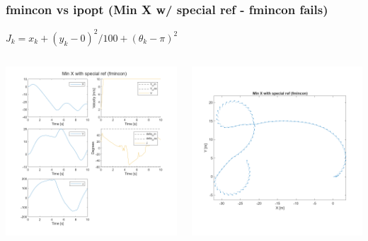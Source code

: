 \documentclass[aspectratio=169]{beamer}
\begin{document}
\begin{frame}
	\frametitle{fmincon vs ipopt (Min X w/ special ref - fmincon fails)}
	$J_k = x_k + (y_k - 0)^2/100 + (\theta_k - \pi)^2$
	\begin{columns}
		\begin{column}{0.4\textwidth}
			\includegraphics[width = \columnwidth]{figs/Min_X_with_special_ref_(fmincon)_traj.png}
		\end{column}
		\begin{column}{0.25\textwidth}
			\includegraphics[width = \columnwidth]{figs/Min_X_with_special_ref_(fmincon)_quiver.png}

\end{column}
\end{columns}
\end{frame}
\end{document}
